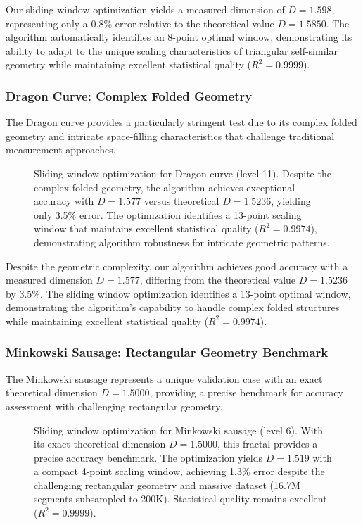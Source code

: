 \documentclass[preprint,12pt]{elsarticle}
\begin{document}
Our sliding window optimization yields a measured dimension of $D = 1.598$, representing only a 0.8\% error relative to the theoretical value $D = 1.5850$. The algorithm automatically identifies an 8-point optimal window, demonstrating its ability to adapt to the unique scaling characteristics of triangular self-similar geometry while maintaining excellent statistical quality ($R^2 = 0.9999$).

\subsubsection{Dragon Curve: Complex Folded Geometry}

The Dragon curve provides a particularly stringent test due to its complex folded geometry and intricate space-filling characteristics that challenge traditional measurement approaches.

\begin{figure}[ht]
\centering
\caption{Sliding window optimization for Dragon curve (level 11). Despite the complex folded geometry, the algorithm achieves exceptional accuracy with $D = 1.577$ versus theoretical $D = 1.5236$, yielding only 3.5\% error. The optimization identifies a 13-point scaling window that maintains excellent statistical quality ($R^2 = 0.9974$), demonstrating algorithm robustness for intricate geometric patterns.}
\label{fig:dragon_optimized}
\end{figure}

Despite the geometric complexity, our algorithm achieves good accuracy with a measured dimension $D = 1.577$, differing from the theoretical value $D = 1.5236$ by 3.5\%. The sliding window optimization identifies a 13-point optimal window, demonstrating the algorithm's capability to handle complex folded structures while maintaining excellent statistical quality ($R^2 = 0.9974$).

\subsubsection{Minkowski Sausage: Rectangular Geometry Benchmark}

The Minkowski sausage represents a unique validation case with an exact theoretical dimension $D = 1.5000$, providing a precise benchmark for accuracy assessment with challenging rectangular geometry.

\begin{figure}[ht]
\centering
\caption{Sliding window optimization for Minkowski sausage (level 6). With its exact theoretical dimension $D = 1.5000$, this fractal provides a precise accuracy benchmark. The optimization yields $D = 1.519$ with a compact 4-point scaling window, achieving 1.3\% error despite the challenging rectangular geometry and massive dataset (16.7M segments subsampled to 200K). Statistical quality remains excellent ($R^2 = 0.9999$).}
\label{fig:minkowski_optimized}
\end{figure}
\end{document}
